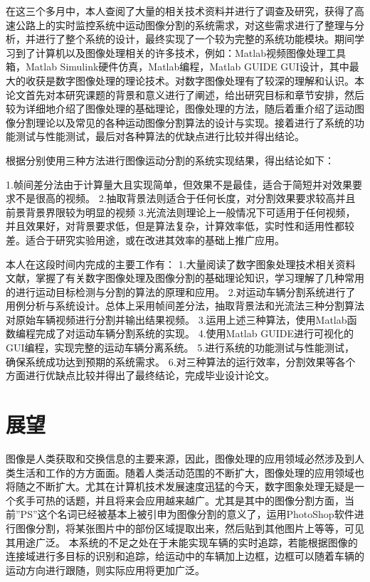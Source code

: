 \documentclass[18pt, twoside, a4paper, dvipdfm]{book}
\begin{document}
	在这三个多月中，本人查阅了大量的相关技术资料并进行了调查及研究，获得了高速公路上的实时监控系统中运动图像分割的系统需求，对这些需求进行了整理与分析，并进行了整个系统的设计，最终实现了一个较为完整的系统功能模块。期间学习到了计算机以及图像处理相关的许多技术，例如：Matlab视频图像处理工具箱，Matlab Simulink硬件仿真，Matlab编程，Matlab GUIDE GUI设计，其中最大的收获是数字图像处理的理论技术。对数字图像处理有了较深的理解和认识。本论文首先对本研究课题的背景和意义进行了阐述，给出研究目标和章节安排，然后较为详细地介绍了图像处理的基础理论，图像处理的方法，随后着重介绍了运动图像分割理论以及常见的各种运动图像分割算法的设计与实现。接着进行了系统的功能测试与性能测试，最后对各种算法的优缺点进行比较并得出结论。

根据分别使用三种方法进行图像运动分割的系统实现结果，得出结论如下：

1.帧间差分法由于计算量大且实现简单，但效果不是最佳，适合于简短并对效果要求不是很高的视频。
2.抽取背景法则适合于任何长度，对分割效果要求较高并且前景背景界限较为明显的视频
3.光流法则理论上一般情况下可适用于任何视频，并且效果好，对背景要求低，但是算法复杂，计算效率低，实时性和适用性都较差。适合于研究实验用途，或在改进其效率的基础上推广应用。

本人在这段时间内完成的主要工作有：
1.大量阅读了数字图象处理技术相关资料文献，掌握了有关数字图像处理及图像分割的基础理论知识，学习理解了几种常用的进行运动目标检测与分割的算法的原理和应用。
2.对运动车辆分割系统进行了用例分析与系统设计。总体上采用帧间差分法，抽取背景法和光流法三种分割算法对原始车辆视频进行分割并输出结果视频。
3.运用上述三种算法，使用Matlab函数编程完成了对运动车辆分割系统的实现。
4.使用Matlab GUIDE进行可视化的GUI编程，实现完整的运动车辆分离系统。
5.进行系统的功能测试与性能测试，确保系统成功达到预期的系统需求。
6.对三种算法的运行效率，分割效果等各个方面进行优缺点比较并得出了最终结论，完成毕业设计论文。
\section{展望}

图像是人类获取和交换信息的主要来源，因此，图像处理的应用领域必然涉及到人类生活和工作的方方面面。随着人类活动范围的不断扩大，图像处理的应用领域也将随之不断扩大。尤其在计算机技术发展速度迅猛的今天，数字图象处理无疑是一个炙手可热的话题，并且将来会应用越来越广。尤其是其中的图像分割方面，当前”PS”这个名词已经被基本上被引申为图像分割的意义了，运用PhotoShop软件进行图像分割，将某张图片中的部份区域提取出来，然后贴到其他图片上等等，可见其用途广泛。
本系统的不足之处在于未能实现车辆的实时追踪，若能根据图像的连接域进行多目标的识别和追踪，给运动中的车辆加上边框，边框可以随着车辆的运动方向进行跟随，则实际应用将更加广泛。
\end{document}
